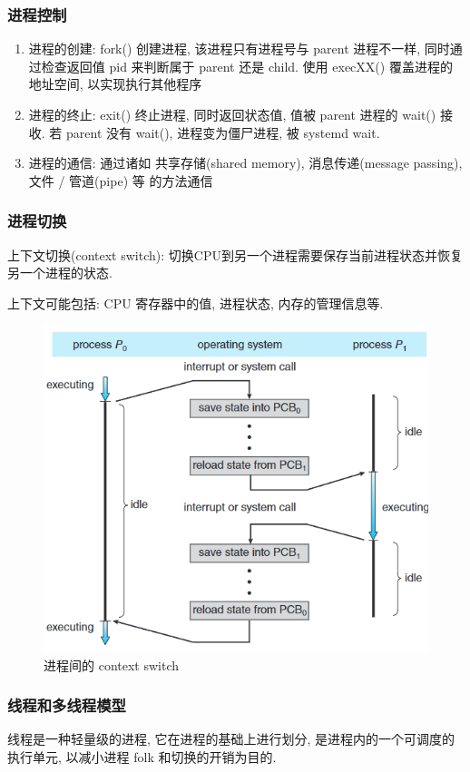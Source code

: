 \subsubsection{进程控制}
\begin{enumerate}
    \item 进程的创建: fork() 创建进程, 该进程只有进程号与 parent 进程不一样, 同时通过检查返回值 pid 来判断属于 parent 还是 child. 
    \subitem 使用 execXX() 覆盖进程的地址空间, 以实现执行其他程序
    \item 进程的终止: exit() 终止进程, 同时返回状态值, 值被 parent 进程的 wait() 接收. 若 parent 没有 wait(), 进程变为僵尸进程, 被 systemd wait. 
    \item 进程的通信: 通过诸如 共享存储(shared memory), 消息传递(message passing), 文件 / 管道(pipe) 等 的方法通信
\end{enumerate}

\subsubsection{进程切换}
上下文切换(context switch): 切换CPU到另一个进程需要保存当前进程状态并恢复另一个进程的状态.

上下文可能包括: CPU 寄存器中的值, 进程状态, 内存的管理信息等. 
\begin{figure}[H]
    \centering
    \includegraphics[width=0.618\linewidth]{pic/OS3/Diagram showing context switch from process to process}
    \caption{进程间的 context switch}
\end{figure}



\subsubsection{线程和多线程模型}
线程是一种轻量级的进程, 它在进程的基础上进行划分, 是进程内的一个可调度的执行单元, 以减小进程 folk 和切换的开销为目的. 

